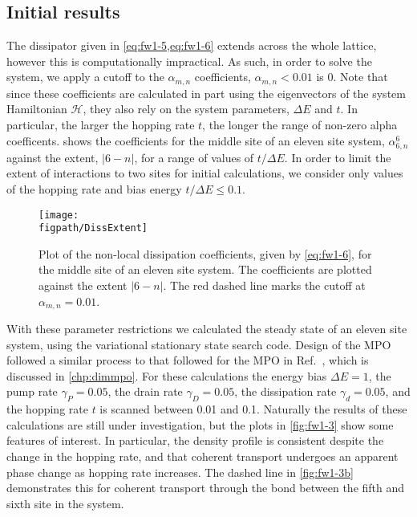 \subsection{Initial results}
The dissipator given in \cref{eq:fw1-5,eq:fw1-6} extends across the whole lattice, however this is computationally impractical. As such, in order to solve the system, we apply a cutoff to the \(\alpha_{m,n}\) coefficients, \(\alpha_{m,n} < 0.01\) is 0. Note that since these coefficients are calculated in part using the eigenvectors of the system Hamiltonian \(\mathcal{H}\), they also rely on the system parameters, \(\Delta E\) and \(t\). In particular, the larger the hopping rate \(t\), the longer the range of non-zero alpha coefficents.  shows the coefficients for the middle site of an eleven site system, \(\alpha_{6,n}^{6}\) against the extent, \(|6-n|\), for a range of values of \( t / \Delta E\). In order to limit the extent of interactions to two sites for initial calculations, we consider only values of the hopping rate and bias energy \(t / \Delta E \leq 0.1\). 

\begin{figure}[ht!]
	\centering
	\texttt{[image: \\figpath/DissExtent]}
	\caption{\label{fig:fw1-2}Plot of the non-local dissipation coefficients, given by \cref{eq:fw1-6}, for the middle site of an eleven site system. The coefficients are plotted against the extent \(|6-n|\). The red dashed line marks the cutoff at \(\alpha_{m,n} = 0.01\).}
\end{figure}

With these parameter restrictions we calculated the steady state of an eleven site system, using the variational stationary state search code. Design of the MPO followed a similar process to that followed for the MPO in Ref.~\cite{Owen2017}, which is discussed in \cref{chp:dimmpo}. For these calculations the energy bias \(\Delta E = 1\), the pump rate \(\gamma_{P} = 0.05\), the drain rate \(\gamma_{D} = 0.05\), the dissipation rate \(\gamma_{d} = 0.05\), and the hopping rate \(t\) is scanned between 0.01 and 0.1. Naturally the results of these calculations are still under investigation, but the plots in \cref{fig:fw1-3} show some features of interest. In particular, the density profile is consistent despite the change in the hopping rate, and that coherent transport undergoes an apparent phase change as hopping rate increases. The dashed line in \cref{fig:fw1-3b} demonstrates this for coherent transport through the bond between the fifth and sixth site in the system.
 

